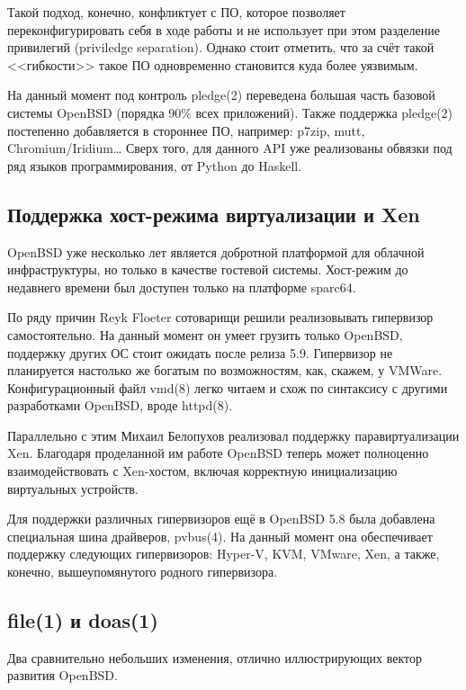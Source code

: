 \documentclass[10pt, a5paper]{article}
\begin{document}
Такой подход, конечно, конфликтует с ПО, которое позволяет переконфигурировать себя в ходе работы и не использует при этом разделение привилегий (priviledge separation). Однако стоит отметить, что за счёт такой <<гибкости>> такое ПО одновременно становится куда более уязвимым.

На данный момент под контроль pledge(2) переведена большая часть базовой системы OpenBSD (порядка 90\% всех приложений). Также поддержка pledge(2) постепенно добавляется в стороннее ПО, например: p7zip, mutt, Chromium/Iridium\ldots{} Сверх того, для данного API уже реализованы обвязки под ряд языков программирования, от Python до Haskell.

\subsection*{Поддержка хост-режима виртуализации и Xen}

OpenBSD уже несколько лет является добротной платформой для облачной инфраструктуры, но только в качестве гостевой системы. Хост-режим до недавнего времени был доступен только на платформе sparc64.

По ряду причин Reyk Floeter сотоварищи решили реализовывать гипервизор самостоятельно. На данный момент он умеет грузить только OpenBSD, поддержку других ОС стоит ожидать после релиза 5.9. Гипервизор не планируется настолько же богатым по возможностям, как, скажем, у VMWare. Конфигурационный файл vmd(8) легко читаем и схож по синтаксису с другими разработками OpenBSD, вроде httpd(8).

Параллельно с этим Михаил Белопухов реализовал поддержку паравиртуализации Xen. Благодаря проделанной им работе OpenBSD теперь может полноценно взаимодействовать с Xen-хостом, включая корректную инициализацию виртуальных устройств.

Для поддержки различных гипервизоров ещё в OpenBSD 5.8 была добавлена специальная шина драйверов, pvbus(4). На данный момент она обеспечивает поддержку следующих гипервизоров: Hyper-V, KVM, VMware, Xen, а также, конечно, вышеупомянутого родного гипервизора.

\subsection*{file(1) и doas(1)}

Два сравнительно небольших изменения, отлично иллюстрирующих вектор развития OpenBSD.
\end{document}
